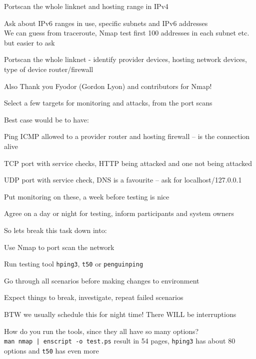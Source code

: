 \documentclass[Screen16to9,17pt]{foils}
\begin{document}



\begin{list2}
\item Portscan the whole linknet and hosting range in IPv4
\item Ask about IPv6 ranges in use, specific subnets and IPv6 addresses\\
We can guess from traceroute, Nmap test first 100 addresses in each subnet etc. but easier to ask
\item Portscan the whole linknet - identify provider devices, hosting network devices, type of device router/firewall
\item Also Thank you Fyodor (Gordon Lyon) and contributors for Nmap!
\end{list2}


Select a few targets for monitoring and attacks, from the port scans

Best case would be to have:
\begin{list2}
\item Ping ICMP allowed to a provider router and hosting firewall -- is the connection alive
\item TCP port with service checks, HTTP being attacked and one not being attacked
\item UDP port with service check, DNS is a favourite -- ask for localhost/127.0.0.1
\item Put monitoring on these, a week before testing is nice
\item Agree on a day or night for testing, inform participants and system owners
\end{list2}


So lets break this task down into:
\begin{list2}
\item Use Nmap to port scan the network
\item Run testing tool \verb+hping3+, \verb+t50+ or \verb+penguinping+
\item Go through all scenarios before making changes to environment
\item Expect things to break, investigate, repeat failed scenarios
\vskip 1cm
\item BTW we usually schedule this for night time! There WILL be interruptions
\vskip 1cm
\item How do you run the tools, since they all have so many options?\\
\verb+man nmap | enscript -o test.ps+ result in 54 pages,
\verb+hping3+ has about 80 options and \verb+t50+ has even more
\end{list2}
\end{document}
